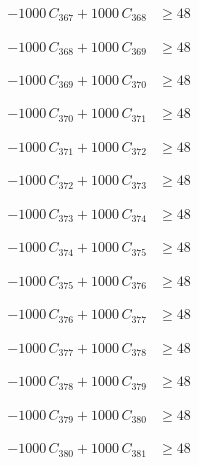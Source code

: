 \documentclass[a4paper,11pt]{article}
\begin{document}
\begin{align}
-1000\,C_{367} + 1000\,C_{368} &\geq 48 \nonumber
\end{align}

\begin{align}
-1000\,C_{368} + 1000\,C_{369} &\geq 48 \nonumber
\end{align}

\begin{align}
-1000\,C_{369} + 1000\,C_{370} &\geq 48 \nonumber
\end{align}

\begin{align}
-1000\,C_{370} + 1000\,C_{371} &\geq 48 \nonumber
\end{align}

\begin{align}
-1000\,C_{371} + 1000\,C_{372} &\geq 48 \nonumber
\end{align}

\begin{align}
-1000\,C_{372} + 1000\,C_{373} &\geq 48 \nonumber
\end{align}

\begin{align}
-1000\,C_{373} + 1000\,C_{374} &\geq 48 \nonumber
\end{align}

\begin{align}
-1000\,C_{374} + 1000\,C_{375} &\geq 48 \nonumber
\end{align}

\begin{align}
-1000\,C_{375} + 1000\,C_{376} &\geq 48 \nonumber
\end{align}

\begin{align}
-1000\,C_{376} + 1000\,C_{377} &\geq 48 \nonumber
\end{align}

\begin{align}
-1000\,C_{377} + 1000\,C_{378} &\geq 48 \nonumber
\end{align}

\begin{align}
-1000\,C_{378} + 1000\,C_{379} &\geq 48 \nonumber
\end{align}

\begin{align}
-1000\,C_{379} + 1000\,C_{380} &\geq 48 \nonumber
\end{align}

\begin{align}
-1000\,C_{380} + 1000\,C_{381} &\geq 48 \nonumber
\end{align}
\end{document}
